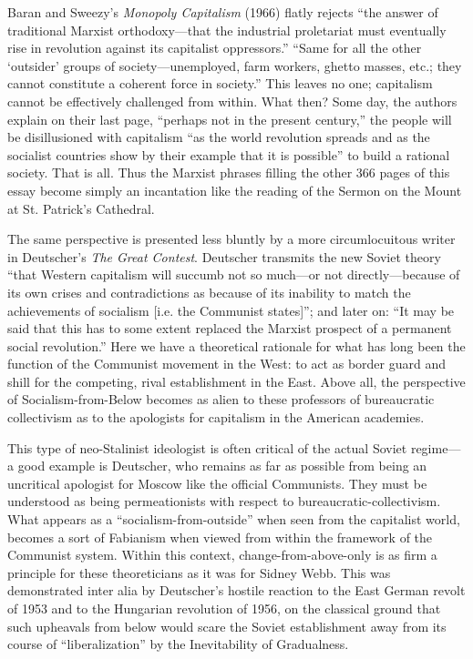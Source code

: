 Baran and Sweezy's \emph{Monopoly Capitalism} (1966) flatly rejects ``the answer of traditional Marxist orthodoxy---that the industrial proletariat must eventually rise in revolution against its capitalist oppressors.'' ``Same for all the other `outsider' groups of society---unemployed, farm workers, ghetto masses, etc.; they cannot constitute a coherent force in society.'' This leaves no one; capitalism cannot be effectively challenged from within. What then? Some day, the authors explain on their last page, ``perhaps not in the present century,'' the people will be disillusioned with capitalism ``as the world revolution spreads and as the socialist countries show by their example that it is possible'' to build a rational society. That is all. Thus the Marxist phrases filling the other 366 pages of this essay become simply an incantation like the reading of the Sermon on the Mount at St. Patrick's Cathedral.

The same perspective is presented less bluntly by a more circumlocuitous writer in Deutscher's \emph{The Great Contest}. Deutscher transmits the new Soviet theory ``that Western capitalism will succumb not so much---or not directly---because of its own crises and contradictions as because of its inability to match the achievements of socialism [i.e. the Communist states]''; and later on: ``It may be said that this has to some extent replaced the Marxist prospect of a permanent social revolution.'' Here we have a theoretical rationale for what has long been the function of the Communist movement in the West: to act as border guard and shill for the competing, rival establishment in the East. Above all, the perspective of Socialism-from-Below becomes as alien to these professors of bureaucratic collectivism as to the apologists for capitalism in the American academies.

This type of neo-Stalinist ideologist is often critical of the actual Soviet regime---a good example is Deutscher, who remains as far as possible from being an uncritical apologist for Moscow like the official Communists. They must be understood as being permeationists with respect to bureaucratic-collectivism. What appears as a ``socialism-from-outside'' when seen from the capitalist world, becomes a sort of Fabianism when viewed from within the framework of the Communist system. Within this context, change-from-above-only is as firm a principle for these theoreticians as it was for Sidney Webb. This was demonstrated inter alia by Deutscher's hostile reaction to the East German revolt of 1953 and to the Hungarian revolution of 1956, on the classical ground that such upheavals from below would scare the Soviet establishment away from its course of ``liberalization'' by the Inevitability of Gradualness.

